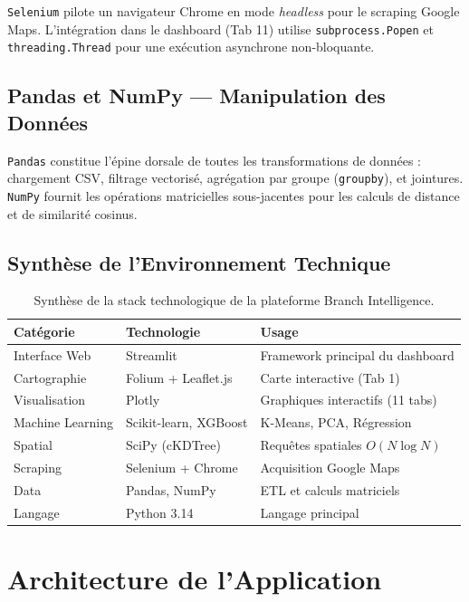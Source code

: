 \texttt{Selenium} pilote un navigateur Chrome en mode \textit{headless} pour le scraping Google Maps. L'intégration dans le dashboard (Tab 11) utilise \texttt{subprocess.Popen} et \texttt{threading.Thread} pour une exécution asynchrone non-bloquante.

\subsection{Pandas et NumPy — Manipulation des Données}

\texttt{Pandas} constitue l'épine dorsale de toutes les transformations de données : chargement CSV, filtrage vectorisé, agrégation par groupe (\texttt{groupby}), et jointures. \texttt{NumPy} fournit les opérations matricielles sous-jacentes pour les calculs de distance et de similarité cosinus.

\subsection{Synthèse de l'Environnement Technique}

\begin{table}[h]
\centering
\begin{tabular}{|l|l|l|}
\hline
\textbf{Catégorie} & \textbf{Technologie} & \textbf{Usage} \\ \hline
Interface Web & Streamlit & Framework principal du dashboard \\ \hline
Cartographie & Folium + Leaflet.js & Carte interactive (Tab 1) \\ \hline
Visualisation & Plotly & Graphiques interactifs (11 tabs) \\ \hline
Machine Learning & Scikit-learn, XGBoost & K-Means, PCA, Régression \\ \hline
Spatial & SciPy (cKDTree) & Requêtes spatiales $O(N \log N)$ \\ \hline
Scraping & Selenium + Chrome & Acquisition Google Maps \\ \hline
Data & Pandas, NumPy & ETL et calculs matriciels \\ \hline
Langage & Python 3.14 & Langage principal \\ \hline
\end{tabular}
\caption{Synthèse de la stack technologique de la plateforme Branch Intelligence.}
\label{tab:tech_stack}
\end{table}

\section{Architecture de l'Application}

